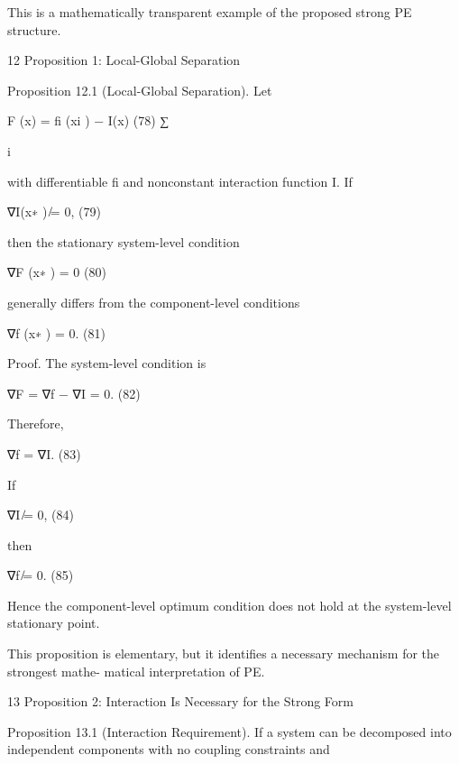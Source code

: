 \documentclass[10pt,a4paper]{article}
\begin{document}
\begin{ManuscriptText}
This is a mathematically transparent example of the proposed strong PE structure.


12        Proposition 1: Local-Global Separation

Proposition 12.1 (Local-Global Separation). Let


                                    F (x) =        fi (xi ) − I(x)                         (78)
                                              ∑︂

                                              i

with differentiable fi and nonconstant interaction function I. If


                                           ∇I(x∗ ) ̸= 0,                                   (79)

then the stationary system-level condition


                                           ∇F (x∗ ) = 0                                    (80)

generally differs from the component-level conditions


                                           ∇f (x∗ ) = 0.                                   (81)

Proof. The system-level condition is


                                       ∇F = ∇f − ∇I = 0.                                   (82)

Therefore,


                                             ∇f = ∇I.                                      (83)

If


                                           ∇I ̸= 0,                                        (84)

then


                                           ∇f ̸= 0.                                        (85)

Hence the component-level optimum condition does not hold at the system-level stationary
point.


This proposition is elementary, but it identifies a necessary mechanism for the strongest mathe-
matical interpretation of PE.


13       Proposition 2: Interaction Is Necessary for the Strong Form

Proposition 13.1 (Interaction Requirement). If a system can be decomposed into independent
components with no coupling constraints and



\end{ManuscriptText}
\end{document}

